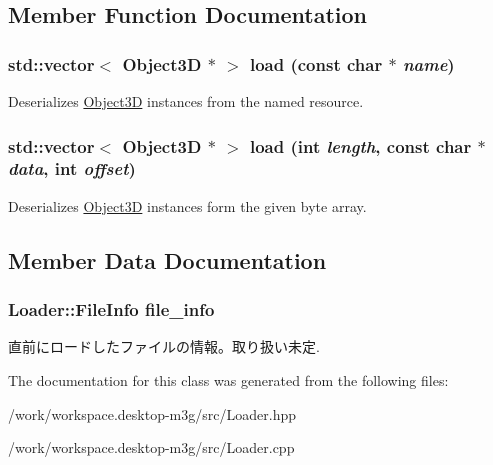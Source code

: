 \subsection{Member Function Documentation}
\hypertarget{classm3g_1_1Loader_27bd86888cdadd349223dcb303e45879}{
\subsubsection[{load}]{\setlength{\rightskip}{0pt plus 5cm}std::vector$<$ {\bf Object3D} $\ast$ $>$ load (const char $\ast$ {\em name})}}
\label{classm3g_1_1Loader_27bd86888cdadd349223dcb303e45879}


Deserializes \hyperlink{classm3g_1_1Object3D}{Object3D} instances from the named resource. \hypertarget{classm3g_1_1Loader_226696271b917ad797016959bb7adbe1}{
\subsubsection[{load}]{\setlength{\rightskip}{0pt plus 5cm}std::vector$<$ {\bf Object3D} $\ast$ $>$ load (int {\em length}, \/  const char $\ast$ {\em data}, \/  int {\em offset})}}
\label{classm3g_1_1Loader_226696271b917ad797016959bb7adbe1}


Deserializes \hyperlink{classm3g_1_1Object3D}{Object3D} instances form the given byte array. 

\subsection{Member Data Documentation}
\hypertarget{classm3g_1_1Loader_b5b2e875f7353dca9dad61c686bccf92}{
\subsubsection[{file\_\-info}]{\setlength{\rightskip}{0pt plus 5cm}Loader::FileInfo {\bf file\_\-info}}}
\label{classm3g_1_1Loader_b5b2e875f7353dca9dad61c686bccf92}


直前にロードしたファイルの情報。取り扱い未定. 

The documentation for this class was generated from the following files:\begin{CompactItemize}
\item 
/work/workspace.desktop-m3g/src/Loader.hpp\item 
/work/workspace.desktop-m3g/src/Loader.cpp\end{CompactItemize}
